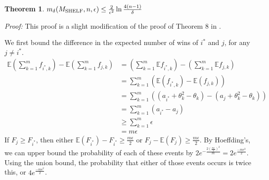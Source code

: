 \documentclass[letterpaper,12pt]{article}
\newcommand{\E}{\mathbb{E}}
\newcommand{\1}{\mathbbm{1}}
\newtheorem{theorem}{Theorem}
\begin{document}


\begin{theorem}
  \label{shelf_bound}
    $m_\delta(M_{\mathrm{SHELF}}, n, \epsilon) \leq \frac{2}{\epsilon^2} \ln \frac{4(n-1)}{\delta}$
\end{theorem}
\emph{Proof:} This proof is a slight modification of the proof of Theorem 8 in \cite{witkowski2018incentive}.

We first bound the difference in the expected number of wins of $i^*$ and $j$, for any $j \neq i^*$. 
\begin{align*}
  \E \left( \sum_{k=1}^m f_{i^*, k}\right) - \E \left( \sum_{k=1}^m f_{j, k}\right)
  &= \left( \sum_{k=1}^m \E f_{i^*, k}\right) - \left( \sum_{k=1}^m \E f_{j, k}\right)\\
  &= \sum_{k=1}^m \left(\E (f_{i^*, k}) - \E (f_{j, k})\right)\\
  &= \sum_{k=1}^m \left((a_{i^*} + \theta_k^2 - \theta_k) - (a_j + \theta_k^2 - \theta_k)\right)\\
  &= \sum_{k=1}^m \left(a_{i^*} - a_j\right)\\
  &\geq \sum_{k=1}^m \epsilon\\
  &=m \epsilon
\end{align*}
If $F_j \geq F_{i^*}$, then either $\E(F_{i^*}) - F_{i^*} \geq \frac{m \epsilon}{2}$ or $F_j - \E(F_j) \geq \frac{m \epsilon}{2}$. By Hoeffding's, we can upper bound the probability of each of these events by $2 e^{-\frac{2 (\frac{m \epsilon}{2})^2}{m}} = 2 e^{\frac{- m \epsilon^2}{2}}$. Using the union bound, the probability that either of those events occurs is twice this, or $4 e^{\frac{- m \epsilon^2}{2}}$.
\end{document}
